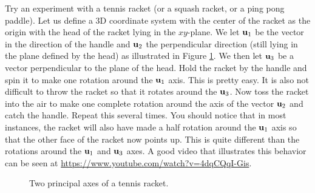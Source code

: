  \label{sec:principal_axis_theorem}

\vspace*{-17 pt}

\vspace*{3 pt}


Try an experiment with a tennis racket (or a squash racket, or a ping pong paddle). Let us define a 3D coordinate system with the center of the racket as the origin with the head of the racket lying in the $xy$-plane. We let $\mathbf{u}_1$ be the vector in the direction of the handle and $\mathbf{u}_2$ the perpendicular direction (still lying in the plane defined by the head) as illustrated in Figure \ref{F:tennis_racket}. We then let $\mathbf{u}_3$ be a vector perpendicular to the plane of the head. Hold the racket by the handle and spin it to make one rotation around the $\mathbf{u}_1$ axis. This is pretty easy. It is also not difficult to throw the racket so that it rotates around the $\mathbf{u}_3$. Now toss the racket into the air to make one complete rotation around the axis of the vector $\mathbf{u}_2$ and catch the handle. Repeat this several times. You should notice that in most instances, the racket will also have made a half rotation around the $\mathbf{u}_1$ axis so that the other face of the racket now points up. This is quite different than the rotations around the $\mathbf{u}_1$ and $\mathbf{u}_3$ axes. A good video that illustrates this behavior can be seen at \url{https://www.youtube.com/watch?v=4dqCQqI-Gis}. 

\begin{figure}[ht]
  \begin{center}
    \caption{Two principal axes of a tennis racket.}
    \label{F:tennis_racket}
  \end{center}
\end{figure}

